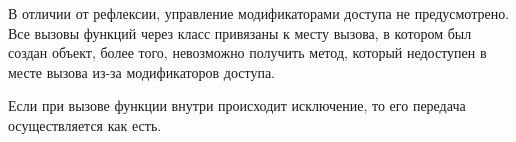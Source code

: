 В отличии от рефлексии, управление модификаторами доступа не предусмотрено. Все вызовы функций через класс  привязаны к месту вызова, в котором был создан  объект, более того, невозможно получить метод, который недоступен в месте вызова из-за модификаторов доступа.

Если при вызове функции внутри происходит исключение, то его передача осуществляется как есть.
